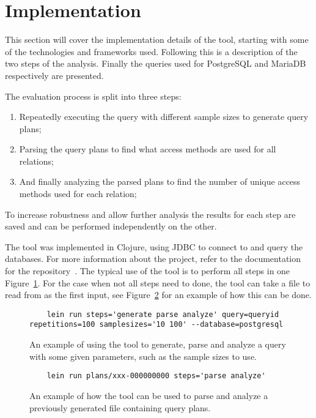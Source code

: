 \section{Implementation}\label{sec:implementation}
This section will cover the implementation details of the tool, starting with
some of the technologies and frameworks used. Following this is a description of
the two steps of the analysis. Finally the queries used for PostgreSQL and
MariaDB respectively are presented.

The evaluation process is split into three steps:
\begin{enumerate}
\item Repeatedly executing the query with different sample sizes to generate
  query plans;
\item Parsing the query plans to find what access methods are used for all
  relations;
\item And finally analyzing the parsed plans to find the number of unique access
  methods used for each relation;
\end{enumerate}

To increase robustness and allow further analysis the results for each step are
saved and can be performed independently on the other.

The tool was implemented in Clojure, using JDBC to connect to and query the
databases. For more information about the project, refer to the documentation for
the repository~\cite{barksten_mbark_m}. The typical use of the tool is to perform all steps in one
Figure~\ref{fig:cmd:runtool1}. For the case when not all steps need to done, the
tool can take a file to read from as the first input, see
Figure~\ref{fig:cmd:runtool2} for an example of how this can be done.

\begin{figure}[ht]
  \begin{verbatim}
    lein run steps='generate parse analyze' query=queryid repetitions=100 samplesizes='10 100' --database=postgresql
  \end{verbatim}
  \caption[Using the tool to generate, parse and analyze a query]{An example of
    using the tool to generate, parse and analyze a query with some given
    parameters, such as the sample sizes to use.}
  \label{fig:cmd:runtool1}
\end{figure}

\begin{figure}[ht]
  \begin{verbatim}
    lein run plans/xxx-000000000 steps='parse analyze'
  \end{verbatim}
  \caption[Using the tool to parse and analyze a previously generated plan]{An
    example of how the tool can be used to parse and analyze a previously
    generated file containing query plans.}
  \label{fig:cmd:runtool2}
\end{figure}

